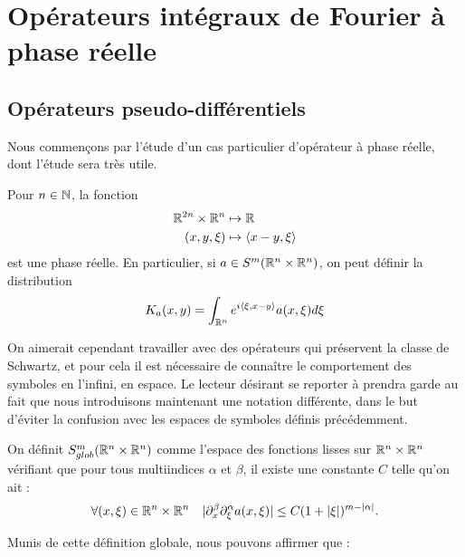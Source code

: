 \section{Opérateurs intégraux de Fourier à phase réelle}

\subsection{Opérateurs pseudo-différentiels}
Nous commençons par l'étude d'un cas particulier d'opérateur à phase réelle, dont l'étude sera très utile.

Pour $n \in \mathbb{N}$, la fonction
\begin{align*}
	\mathbb{R}^{2n}\times \mathbb{R}^n &\mapsto \mathbb{R}\\
	(x,y,\xi) &\mapsto \langle x-y,\xi \rangle
\end{align*}
est une phase réelle. En particulier, si $a \in S^m(\mathbb{R}^n\times \mathbb{R}^n)$, on peut définir la distribution
\begin{equation*}
	K_a(x,y)=\int_{\mathbb{R}^n}e^{i\langle \xi, x-y\rangle}a(x,\xi)d\xi
\end{equation*}

On aimerait cependant travailler avec des opérateurs qui préservent la classe de Schwartz, et pour cela il est nécessaire de connaître le comportement des symboles en l'infini, en espace. Le lecteur désirant se reporter à \cite{hormander2007} prendra garde au fait que nous introduisons maintenant une notation différente, dans le but d'éviter la confusion avec les espaces de symboles définis précédemment.

\begin{defn}
	On définit $S^m_{glob}(\mathbb{R}^n\times \mathbb{R}^n)$ comme l'espace des fonctions lisses sur $\mathbb{R}^n\times \mathbb{R}^n$ vérifiant que pour tous multiindices $\alpha$ et $\beta$, il existe une constante $C$ telle qu'on ait :
	\begin{align*}
		&\forall (x,\xi)\in \mathbb{R}^n\times\mathbb{R}^n &|\partial^{\beta}_x\partial^{\alpha}_{\xi}a(x,\xi)| \leq C(1+|\xi|)^{m-|\alpha|}.
	\end{align*}
\end{defn}

Munis de cette définition globale, nous pouvons affirmer que :

